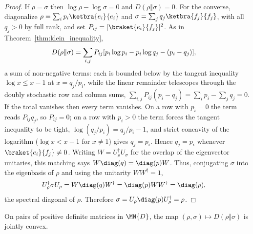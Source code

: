 \begin{proof}\leanok
    If $\rho=\sigma$ then $\log\rho-\log\sigma=0$ and
    $D(\rho\Vert\sigma)=0$.
    For the converse, diagonalize $\rho=\sum_i p_i\ketbra{e_i}{e_i}$ and
    $\sigma=\sum_j q_j\ketbra{f_j}{f_j}$, with all $q_j>0$ by full rank, and set
    $P_{ij}=\lvert\braket{e_i}{f_j}\rvert^2$. As in
    Theorem~\ref{thm:klein_inequality},
    \begin{align}
        D(\rho\Vert\sigma)
         & =\sum_{i,j}P_{ij}
                          [p_i\log p_i-p_i\log q_j-(p_i-q_j)],
        \notag
    \end{align}
    a sum of non-negative terms: each is bounded below by the tangent inequality
    $\log x\le x-1$ at $x=q_j/p_i$, while the linear remainder telescopes through
    the doubly stochastic row and column sums,
    $\sum_{i,j}P_{ij}(p_i-q_j)=\sum_ip_i-\sum_jq_j=0$.
    If the total vanishes then every term vanishes. On a row with $p_i=0$ the term
    reads $P_{ij}q_j$, so $P_{ij}=0$; on a row with $p_i>0$ the term forces the
    tangent inequality to be tight,
    $\log(q_j/p_i)=q_j/p_i-1$, and strict concavity of the logarithm
    ($\log x<x-1$ for $x\neq1$) gives $q_j=p_i$. Hence $q_j=p_i$ whenever
    $\braket{e_i}{f_j}\neq0$. Writing $W=U_\rho^\dagger U_\sigma$ for the overlap
    of the eigenvector unitaries, this matching says
    $W\diag(q)=\diag(p)W$. Thus, conjugating $\sigma$ into the eigenbasis of
    $\rho$ and using the unitarity $WW^\dagger=1$,
    \begin{align}
        U_\rho^\dagger\sigma U_\rho
         & =W\diag(q)W^\dagger
        =\diag(p)WW^\dagger
        =\diag(p),
        \notag
    \end{align}
    the spectral diagonal of $\rho$. Therefore
    $\sigma=U_\rho\diag(p)U_\rho^\dagger=\rho$.
\end{proof}

\begin{theorem}
    \label{thm:relative_entropy_joint_convexity}
    \leanok
    On pairs of positive definite matrices in $\MN{D}$, the map
    $(\rho,\sigma)\mapsto D(\rho\Vert\sigma)$ is jointly convex.
\end{theorem}

